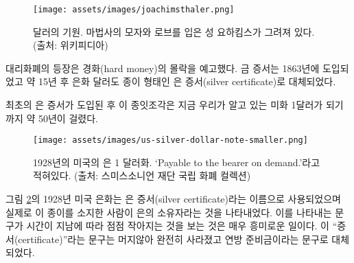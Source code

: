\begin{figure}
	\centering
	\texttt{[image: assets/images/joachimsthaler.png]}
	\caption{달러의 기원. 마법사의 모자와 로브를 입은 성 요하킴스가 그려져 있다. (출처: 위키피디아)}
	\label{fig:joachimsthaler}
\end{figure}

\begin{comment}
	The introduction of representative money heralded the downfall of hard
	money. Gold certificates were introduced in 1863, and about fifteen
	years later, the silver dollar was also slowly but surely being replaced
	by a paper proxy: the silver certificate. \cite{wiki:silver-certificate}
\end{comment}
대리화폐의 등장은 경화(hard money)의 몰락을 예고했다. 
금 증서는 1863년에 도입되었고 약 15년 후 은화 달러도 종이 형태인 은 증서(silver certificate)로 대체되었다.\cite{wiki:silver-certificate}

\begin{comment}
	It took about 50 years from the introduction of the first silver
	certificates until these pieces of paper morphed into something that we
	would today recognize as one U.S. dollar.
\end{comment}
최초의 은 증서가 도입된 후 이 종잇조각은 
지금 우리가 알고 있는 미화 1달러가 되기까지 약 50년이 걸렸다.

\begin{figure}
	\centering
	\texttt{[image: assets/images/us-silver-dollar-note-smaller.png]}
	\caption{1928년의 미국의 은 1 달러화. `Payable to the bearer on demand.'라고 적혀있다. (출처: 스미스소니언 재단 국립 화폐 컬렉션)}
	\label{fig:us-silver-dollar-note-smaller}
\end{figure}

\begin{comment}
	Note that the 1928 U.S. silver dollar in
	Figure~\ref{fig:us-silver-dollar-note-smaller} still goes by the name of
	\textit{silver certificate}, indicating that this is indeed simply a document
	stating that the bearer of this piece of paper is owed a piece of silver. It is
	interesting to see that the text which indicates this got smaller over time. The
	trace of \enquote{certificate} vanished completely after a while, being replaced
	by the reassuring statement that these are federal reserve notes.
\end{comment}
그림 \ref{fig:us-silver-dollar-note-smaller}의 1928년 미국 은화는 은 증서(silver certificate)라는
이름으로 사용되었으며 실제로 이 종이를 소지한 사람이 은의 소유자라는 것을 나타내었다. 
이를 나타내는 문구가 시간이 지남에 따라 점점 작아지는 것을 보는 것은 매우 흥미로운 일이다. 
이 \enquote{증서(certificate)}라는 문구는 머지않아 완전히 사라졌고 연방 준비금이라는 문구로 대체되었다.


